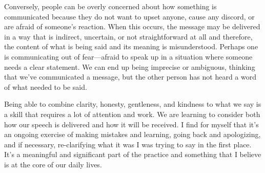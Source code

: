 Conversely, people can be overly concerned about how something is 
communicated because they do not want to upset anyone, cause any 
discord, or are afraid of someone's reaction. When this occurs, the 
message may be delivered in a way that is indirect, uncertain, or not 
straightforward at all and therefore, the content of what is being said 
and its meaning is misunderstood. Perhaps one is communicating out of 
fear---afraid to speak up in a situation where someone needs a clear 
statement. We can end up being imprecise or ambiguous, thinking that 
we've communicated a message, but the other person has not heard a word 
of what needed to be said.

Being able to combine clarity, honesty, gentleness, and kindness to 
what we say is a skill that requires a lot of attention and work. We 
are learning to consider both how our speech is delivered and how it 
will be received. I find for myself that it's an ongoing exercise of 
making mistakes and learning, going back and apologizing, and if 
necessary, re-clarifying what it was I was trying to say in the first 
place. It's a meaningful and significant part of the practice and 
something that I believe is at the core of our daily lives.

